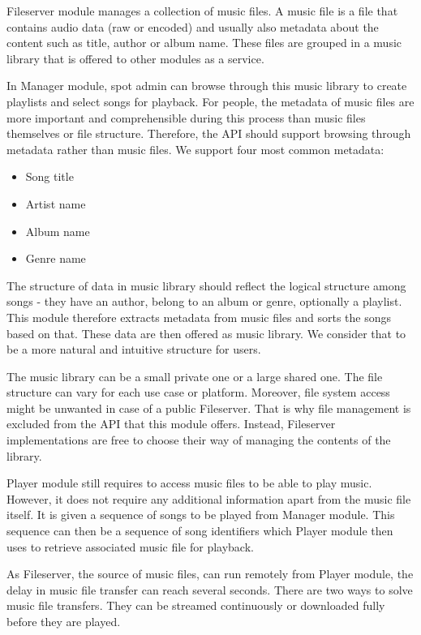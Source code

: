 Fileserver module manages a collection of music files. A music file is a file that contains audio data (raw or encoded) and usually also metadata about the content such as title, author or album name. These files are grouped in a music library that is offered to other modules as a service.
\par
In Manager module, spot admin can browse through this music library to create playlists and select songs for playback. For people, the metadata of music files are more important and comprehensible during this process than music files themselves or file structure. Therefore, the API should support browsing through metadata rather than music files. We support four most common metadata:
\begin{itemize}
    \item Song title
    \item Artist name
    \item Album name
    \item Genre name
\end{itemize}
\par
The structure of data in music library should reflect the logical structure among songs - they have an author, belong to an album or genre, optionally a playlist. This module therefore extracts metadata from music files and sorts the songs based on that. These data are then offered as music library. We consider that to be a more natural and intuitive structure for users.
\par
The music library can be a small private one or a large shared one. The file structure can vary for each use case or platform. Moreover, file system access might be unwanted in case of a public Fileserver. That is why file management is excluded from the API that this module offers. Instead, Fileserver implementations are free to choose their way of managing the contents of the library.
\par
Player module still requires to access music files to be able to play music. However, it does not require any additional information apart from the music file itself. It is given a sequence of songs to be played from Manager module. This sequence can then be a sequence of song identifiers which Player module then uses to retrieve associated music file for playback.
\par
As Fileserver, the source of music files, can run remotely from Player module, the delay in music file transfer can reach several seconds. There are two ways to solve music file transfers. They can be streamed continuously or downloaded fully before they are played.
